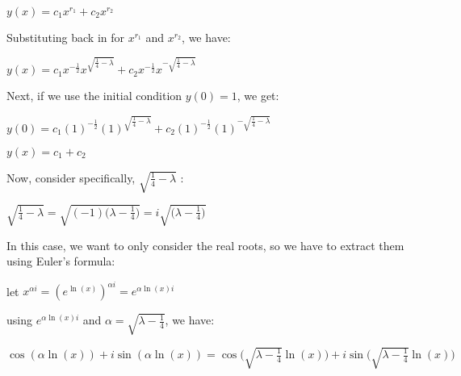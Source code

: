 \documentclass[executivepaper]{article}
\begin{document}
\begin{flushleft}
\begin{center}
$y(x)=c_{1}x^{r_{1}}+c_{2}x^{r_{2}}$

\end{center}

Substituting back in for $x^{r_{1}}$ and $x^{r_{2}}$, we have:

\begin{center}

$y(x)=c_{1}x^{-\frac{1}{2}}x^{\sqrt{\frac{1}{4}-\lambda}}+c_{2}x^{-\frac{1}{2}}x^{-\sqrt{\frac{1}{4}-\lambda}}$

\end{center}

Next, if we use the initial condition $y(0)=1$, we get:

\begin{center}

$y(0)=c_{1}(1)^{-\frac{1}{2}}(1)^{\sqrt{\frac{1}{4}-\lambda}}+c_{2}(1)^{-\frac{1}{2}}(1)^{-\sqrt{\frac{1}{4}-\lambda}}$

\hspace{1mm}

$y(x)=c_{1}+c_{2}$

\end{center}

Now, consider specifically, $\sqrt{\frac{1}{4}-\lambda}$ \vspace{1mm} :

\begin{center}

$\sqrt{\frac{1}{4}-\lambda}=\sqrt{(-1)\bigg(\lambda - \frac{1}{4}\bigg)}=i\sqrt{\bigg(\lambda - \frac{1}{4}\bigg)}$

\end{center}

In this case, we want to only consider the real roots, so we have to extract them using Euler's formula:

\begin{center}

let $x^{\alpha i}=(e^{\ln(x)})^{\alpha i}=e^{\alpha \ln(x) i}$

\hspace{1mm}

using $e^{\alpha \ln(x) i}$ and $\alpha=\sqrt{\lambda-\frac{1}{4}}$, we have:

\hspace{1mm}

$\cos(\alpha \ln(x))+i\sin(\alpha \ln(x))=\cos\bigg(\sqrt{\lambda-\frac{1}{4}} \ln(x)\bigg)+i\sin\bigg(\sqrt{\lambda-\frac{1}{4}} \ln(x)\bigg)$

\end{center}


\end{flushleft}
\end{document}
